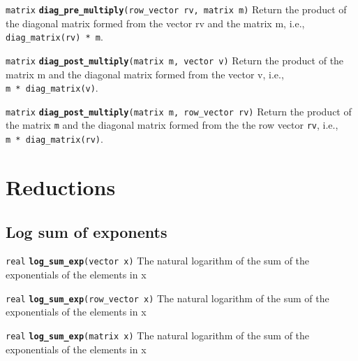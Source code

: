 \documentclass[
  10pt,
]{book}
\begin{document}
\texttt{matrix} \textbf{\texttt{diag\_pre\_multiply}}\texttt{(row\_vector\ rv,\ matrix\ m)}\newline
Return the product of the diagonal matrix formed from the vector rv
and the matrix m, i.e., \texttt{diag\_matrix(rv)\ *\ m}.


\texttt{matrix} \textbf{\texttt{diag\_post\_multiply}}\texttt{(matrix\ m,\ vector\ v)}\newline
Return the product of the matrix m and the diagonal matrix formed from
the vector v, i.e., \texttt{m\ *\ diag\_matrix(v)}.


\texttt{matrix} \textbf{\texttt{diag\_post\_multiply}}\texttt{(matrix\ m,\ row\_vector\ rv)}\newline
Return the product of the matrix \texttt{m} and the diagonal matrix formed
from the the row vector \texttt{rv}, i.e., \texttt{m\ *\ diag\_matrix(rv)}.

\hypertarget{reductions}{%
\section{Reductions}\label{reductions}}

\hypertarget{log-sum-of-exponents}{%
\subsection{Log sum of exponents}\label{log-sum-of-exponents}}


\texttt{real} \textbf{\texttt{log\_sum\_exp}}\texttt{(vector\ x)}\newline
The natural logarithm of the sum of the exponentials of the elements
in x


\texttt{real} \textbf{\texttt{log\_sum\_exp}}\texttt{(row\_vector\ x)}\newline
The natural logarithm of the sum of the exponentials of the elements
in x


\texttt{real} \textbf{\texttt{log\_sum\_exp}}\texttt{(matrix\ x)}\newline
The natural logarithm of the sum of the exponentials of the elements
in x
\end{document}
